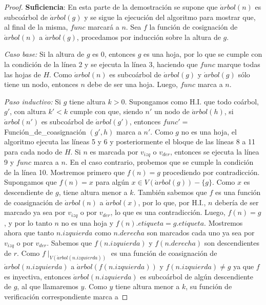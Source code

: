 \begin{proof}
     \textbf{Suficiencia}: En esta parte de la demostración se supone que
     $\acute{a}rbol(n)$ es subcoárbol de $\acute{a}rbol(g)$ y se sigue la
     ejecución del algoritmo para mostrar que, al final de la misma, $func$
     marcará a $n$. Sea $f$ la función de cosignación de $\acute{a}rbol(n)$ a
     $\acute{a}rbol(g)$, procedamos por inducción sobre la altura de $g$.

    \emph{Caso base:} Si la altura de $g$ es 0, entonces $g$ es una hoja, por lo
    que se cumple con la condición de la línea 2 y se ejecuta la línea 3,
    haciendo que $func$ marque todas las hojas de $H$. Como $\acute{a}rbol(n)$
    es subcoárbol de $\acute{a}rbol(g)$ y $\acute{a}rbol(g)$ sólo tiene un nodo,
    entonces $n$ debe de ser una hoja. Luego, $func$ marca a $n$.

    \emph{Paso inductivo:} Si $g$ tiene altura $k > 0$. Supongamos como H.I. que
    todo coárbol, $g'$, con altura $k' < k$ cumple con que, siendo $n'$ un nodo
    de $\acute{a}rbol(h)$, si $\acute{a}rbol(n')$ es subcoárbol de
    $\acute{a}rbol(g')$, entonces $func'=$Función\_de\_coasignación $(g',h)$
    marca a $n'$. Como $g$ no es una hoja, el algoritmo ejecuta las líneas 5 y 6
    y posteriormente el bloque de las líneas 8 a 11 para cada nodo de $H$. Si
    $n$ es marcada por $v_{izq}$ o $v_{der}$, entonces se ejecuta la línea 9 y
    $func$ marca a $n$. En el caso contrario, probemos que se cumple la
    condición de la línea 10. Mostremos primero que $f(n) = g$ procediendo por
    contradicción. Supongamos que $f(n) = x$ para algún $x\in
    V(\acute{a}rbol(g))-\{g\}$. Como $x$ es descendiente de $g$, tiene altura
    menor a $k$. También sabemos que $f$ es una función de coasignación de
    $\acute{a}rbol(n)$ a $\acute{a}rbol(x)$, por lo que, por H.I., $n$ debería
    de ser marcado ya sea por $v_{izq}$ o por $v_{der}$, lo que es una
    contradicción. Luego, $f(n) = g$, y por lo tanto $n$ no es una hoja y
    $f(n).etiqueta = g.etiqueta$. Mostremos ahora que tanto $n.izquierda$ como
    $n.derecha$ son marcados cada uno ya sea por $v_{izq}$ o por $v_{der}$.
    Sabemos que $f(n.izquierda)$ y $f(n.derecha)$ son descendientes de $r$. Como
    $f\mid_{V(\acute{a}rbol(n.izquierda))}$ es una función de coasignación de
    $\acute{a}rbol(n.izquierda)$ a $\acute{a}rbol(f(n.izquierda))$ y $f(n.izquierda)
    \neq g$ ya que $f$ es inyectiva, entonces $\acute{a}rbol(n.izquierda)$ es
    subcoárbol de algún descendiente de $g$, al que llamaremos $y$. Como $y$
    tiene altura menor a $k$, su función de verificación correspondiente marca a

\end{proof}
